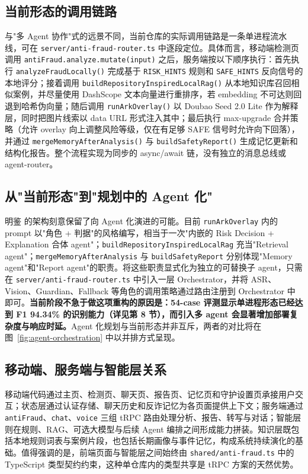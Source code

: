 \documentclass[UTF8,a4paper,12pt]{ctexart}
\begin{document}
\subsection{当前形态的调用链路}

与"多 Agent 协作"式的远景不同，当前仓库的实际调用链路是一条单进程流水线，可在 \texttt{server/anti-fraud-router.ts} 中逐段定位。具体而言，移动端检测页调用 \texttt{antiFraud.analyze.mutate(input)} 之后，服务端按以下顺序执行：首先执行 \texttt{analyzeFraudLocally()} 完成基于 \texttt{RISK\_HINTS} 规则和 \texttt{SAFE\_HINTS} 反向信号的本地评分；接着调用 \texttt{buildRepositoryInspiredLocalRag()} 从本地知识库召回相似案例，并尽量使用 DashScope 文本向量进行重排序，若 embedding 不可达则回退到哈希伪向量；随后调用 \texttt{runArkOverlay()} 以 Doubao Seed 2.0 Lite 作为解释层，同时把图片线索以 data URL 形式注入其中；最后执行 max-upgrade 合并策略（允许 overlay 向上调整风险等级，仅在有足够 SAFE 信号时允许向下回落），并通过 \texttt{mergeMemoryAfterAnalysis()} 与 \texttt{buildSafetyReport()} 生成记忆更新和结构化报告。整个流程实现为同步的 async/await 链，没有独立的消息总线或 agent-router。

\subsection{从"当前形态"到"规划中的 Agent 化"}

明鉴 的架构刻意保留了向 Agent 化演进的可能。目前 \texttt{runArkOverlay} 内的 prompt 以"角色 + 判据"的风格编写，相当于一次"内嵌的 Risk Decision + Explanation 合体 agent"；\texttt{buildRepositoryInspiredLocalRag} 充当"Retrieval agent"；\texttt{mergeMemoryAfterAnalysis} 与 \texttt{buildSafetyReport} 分别体现"Memory agent"和"Report agent"的职责。将这些职责显式化为独立的可替换子 agent，只需在 \texttt{server/anti-fraud-router.ts} 中引入一层 Orchestrator，并将 ASR、Vision、Guardian、Fallback 等角色的调用策略通过路由注册到 Orchestrator 中即可。\textbf{当前阶段不急于做这项重构的原因是：54-case 评测显示单进程形态已经达到 F1 94.34\% 的识别能力（详见第 8 节），而引入多 agent 会显著增加部署复杂度与响应时延。}Agent 化规划与当前形态并非互斥，两者的对比将在图~\ref{fig:agent-orchestration} 中以并排方式呈现。

\subsection{移动端、服务端与智能层关系}

移动端代码通过主页、检测页、聊天页、报告页、记忆页和守护设置页承接用户交互；状态层通过认证存储、聊天历史和反诈记忆为各页面提供上下文；服务端通过 \texttt{antiFraud}、\texttt{chat}、\texttt{voice} 三组 tRPC 路由处理分析、报告、转写与对话；智能层则在规则、RAG、可选大模型与后续 Agent 编排之间形成能力拼装。知识层既包括本地规则词表与案例片段，也包括长期画像与事件记忆，构成系统持续演化的基础。值得强调的是，前端页面与智能层之间始终由 \texttt{shared/anti-fraud.ts} 中的 TypeScript 类型契约约束，这种单仓库内的类型共享是 tRPC 方案的天然优势。
\end{document}
